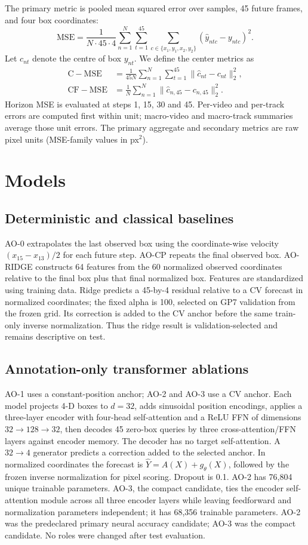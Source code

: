 \documentclass[11pt]{article}
\begin{document}
The primary metric is pooled mean squared error over samples, 45 future frames, and four box coordinates:
\begin{equation}
\mathrm{MSE}=\frac{1}{N\cdot45\cdot4}\sum_{n=1}^{N}\sum_{t=1}^{45}\sum_{c\in\{x_1,y_1,x_2,y_2\}} (\hat y_{ntc}-y_{ntc})^2.
\end{equation}
Let $c_{nt}$ denote the centre of box $y_{nt}$. We define the center metrics as\begin{align}\mathrm{C\!-\!MSE}&=\frac{1}{45N}\sum_{n=1}^{N}\sum_{t=1}^{45}\|\hat c_{nt}-c_{nt}\|_2^2,\\\mathrm{CF\!-\!MSE}&=\frac{1}{N}\sum_{n=1}^{N}\|\hat c_{n,45}-c_{n,45}\|_2^2.\end{align} Horizon MSE is evaluated at steps 1, 15, 30 and 45. Per-video and per-track errors are computed first within unit; macro-video and macro-track summaries average those unit errors. The primary aggregate and secondary metrics are raw pixel units (MSE-family values in px$^2$).

\section{Models}
\subsection{Deterministic and classical baselines}
AO-0 extrapolates the last observed box using the coordinate-wise velocity $(x_{15}-x_{13})/2$ for each future step. AO-CP repeats the final observed box. AO-RIDGE constructs 64 features from the 60 normalized observed coordinates relative to the final box plus that final normalized box. Features are standardized using training data. Ridge predicts a 45-by-4 residual relative to a CV forecast in normalized coordinates; the fixed alpha is 100, selected on GP7 validation from the frozen grid. Its correction is added to the CV anchor before the same train-only inverse normalization. Thus the ridge result is validation-selected and remains descriptive on test.

\subsection{Annotation-only transformer ablations}
AO-1 uses a constant-position anchor; AO-2 and AO-3 use a CV anchor. Each model projects 4-D boxes to $d=32$, adds sinusoidal position encodings, applies a three-layer encoder with four-head self-attention and a ReLU FFN of dimensions $32\to128\to32$, then decodes 45 zero-box queries by three cross-attention/FFN layers against encoder memory. The decoder has no target self-attention. A $32\to4$ generator predicts a correction added to the selected anchor. In normalized coordinates the forecast is $\hat Y= A(X)+g_{\theta}(X)$, followed by the frozen inverse normalization for pixel scoring. Dropout is 0.1. AO-2 has 76,804 unique trainable parameters. AO-3, the compact candidate, ties the encoder self-attention module across all three encoder layers while leaving feedforward and normalization parameters independent; it has 68,356 trainable parameters. AO-2 was the predeclared primary neural accuracy candidate; AO-3 was the compact candidate. No roles were changed after test evaluation.
\end{document}
